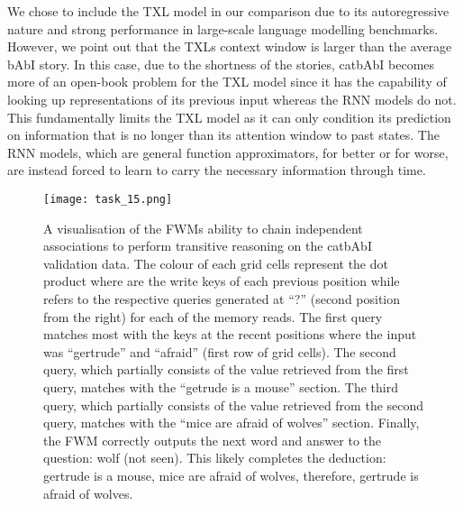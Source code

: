 \documentclass{article} \usepackage{iclr2021_conference,times}
\begin{document}
We chose to include the TXL model in our comparison due to its autoregressive nature and strong performance in large-scale language modelling benchmarks.
However, we point out that the TXLs context window is larger than the average bAbI story.
In this case, due to the shortness of the stories, catbAbI becomes more of an open-book problem for the TXL model since it has the capability of looking up representations of its previous input whereas the RNN models do not.
This fundamentally limits the TXL model as it can only condition its prediction on information that is no longer than its attention window to past states.
The RNN models, which are general function approximators, for better or for worse, are instead forced to learn to carry the necessary information through time. 
\begin{figure}[!ht]
  \centering
\texttt{[image: task\_15.png]}
  \vspace{-3pt}
  \caption{
  A visualisation of the FWMs ability to chain independent associations to perform transitive reasoning on the catbAbI validation data.
  The colour of each grid cells represent the dot product  where  are the write keys of each previous position while  refers to the respective queries generated at ``?'' (second position from the right) for each of the  memory reads.
  The first query matches most with the keys at the recent positions where the input was ``gertrude'' and ``afraid'' (first row of grid cells). 
  The second query, which partially consists of the value retrieved from the first query, matches with the ``getrude is a mouse'' section.
  The third query, which partially consists of the value retrieved from the second query, matches with the ``mice are afraid of wolves'' section.
  Finally, the FWM correctly outputs the next word and answer to the question: wolf (not seen).
  This likely completes the deduction: gertrude is a mouse, mice are afraid of wolves, therefore, gertrude is afraid of wolves.}
  \vspace{-5pt}
  \label{fig:task15}
\end{figure}
\end{document}

